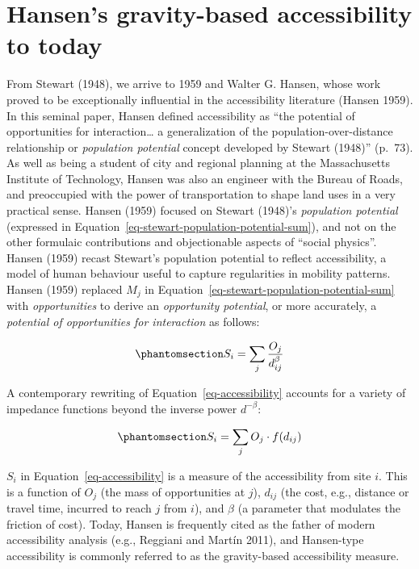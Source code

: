 \documentclass[
]{article}
\begin{document}
\section{Hansen's gravity-based accessibility to
today}\label{grav-to-today}

From Stewart (1948), we arrive to 1959 and Walter G. Hansen, whose work
proved to be exceptionally influential in the accessibility literature
(Hansen 1959). In this seminal paper, Hansen defined accessibility as
``the potential of opportunities for interaction\ldots{} a
generalization of the population-over-distance relationship or
\emph{population potential} concept developed by Stewart (1948)''
(p.~73). As well as being a student of city and regional planning at the
Massachusetts Institute of Technology, Hansen was also an engineer with
the Bureau of Roads, and preoccupied with the power of transportation to
shape land uses in a very practical sense. Hansen (1959) focused on
Stewart (1948)'s \emph{population potential} (expressed in
Equation~\ref{eq-stewart-population-potential-sum}), and not on the
other formulaic contributions and objectionable aspects of ``social
physics''. Hansen (1959) recast Stewart's population potential to
reflect accessibility, a model of human behaviour useful to capture
regularities in mobility patterns. Hansen (1959) replaced \(M_j\) in
Equation~\ref{eq-stewart-population-potential-sum} with
\emph{opportunities} to derive an \emph{opportunity potential}, or more
accurately, a \emph{potential of opportunities for interaction} as
follows:

\begin{equation}\phantomsection\label{eq-accessibility}{
S_{i} = \sum_j \frac{O_j }{d_{ij}^\beta}
}\end{equation}

A contemporary rewriting of Equation~\ref{eq-accessibility} accounts for
a variety of impedance functions beyond the inverse power
\(d^{-\beta}\):

\begin{equation}\phantomsection\label{eq-accessibility-general}{
S_{i} = \sum_j O_j \cdot f(d_{ij})
}\end{equation}

\(S_{i}\) in Equation~\ref{eq-accessibility} is a measure of the
accessibility from site \(i\). This is a function of \(O_j\) (the mass
of opportunities at \(j\)), \(d_{ij}\) (the cost, e.g., distance or
travel time, incurred to reach \(j\) from \(i\)), and \(\beta\) (a
parameter that modulates the friction of cost). Today, Hansen is
frequently cited as the father of modern accessibility analysis (e.g.,
Reggiani and Martín 2011), and Hansen-type accessibility is commonly
referred to as the gravity-based accessibility measure.
\end{document}
